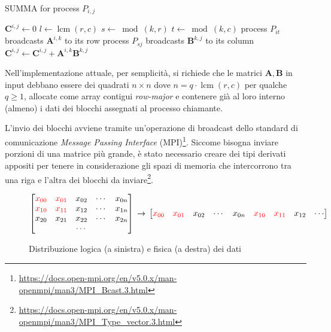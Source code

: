 \documentclass[a4paper]{article}
\DeclareMathOperator{\lcm}{lcm}
\begin{document}
\begin{algorithm}[ht]
    \caption{SUMMA for process $P_{i,j}$}
    \begin{algorithmic}
        \State $\mathbf{C}^{i,j} \gets 0$
        \State $l \gets \lcm(r,c)$
        \State $s \gets \bmod(k, r)$
        \State $t \gets \bmod(k, c)$
        \State process $P_{it}$ broadcasts $\mathbf{A}^{i,k}$ to its row
        \State process $P_{sj}$ broadcasts $\mathbf{B}^{k,j}$ to its column
        \State $\mathbf{C}^{i,j} \gets \mathbf{C}^{i,j} + \mathbf{A}^{i,k}\mathbf{B}^{k,j}$
        \EndFor
    \end{algorithmic}
\end{algorithm}

\medskip Nell'implementazione attuale, per semplicità, si richiede che le matrici $\mathbf{A}, \mathbf{B}$ in input debbano essere dei quadrati $n \times n$ dove $n = q \cdot \lcm(r,c)$ per qualche $q \ge 1$, allocate come array contigui \textit{row-major} e contenere già al loro interno (almeno) i dati dei blocchi assegnati al processo chiamante.

L'invio dei blocchi avviene tramite un'operazione di broadcast dello standard di comunicazione \textit{Message Passing Interface} (MPI)\footnote{\url{https://docs.open-mpi.org/en/v5.0.x/man-openmpi/man3/MPI_Bcast.3.html}}.
Siccome bisogna inviare porzioni di una matrice più grande, è stato necessario creare dei tipi derivati appositi per tenere in considerazione gli spazi di memoria che intercorrono tra una riga e l'altra dei blocchi da inviare\footnote{\url{https://docs.open-mpi.org/en/v5.0.x/man-openmpi/man3/MPI_Type_vector.3.html}}.

\begin{figure}[h]
    $$
        \begin{bmatrix}
            \color{red} x_{00} & \color{red} x_{01} & x_{02} & \cdots & x_{0n} \\
            \color{red} x_{10} & \color{red} x_{11} & x_{12} & \cdots & x_{1n} \\
            x_{20}             & x_{21}             & x_{22} & \cdots & x_{2n} \\
                               &                    & \cdots &        &        \\
        \end{bmatrix}\\ \rightarrow\\
        \begin{bmatrix}
            \color{red} x_{00} & \color{red} x_{01} & x_{02} & \cdots & x_{0n} & \color{red} x_{10} & \color{red} x_{11} & x_{12} & \cdots
        \end{bmatrix}
    $$
    \caption{Distribuzione logica (a sinistra) e fisica (a destra) dei dati}
\end{figure}
\end{document}
